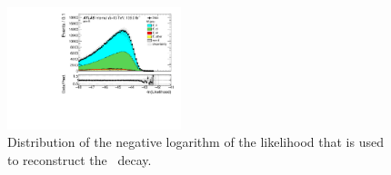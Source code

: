 \documentclass[letterpaper,12pt]{article}
\begin{document}
\begin{figure}%
	\centering
	\includegraphics[width=0.45\textwidth]{prefit/DataMC_h_LLR_all_3bunc.pdf}
	\caption{Distribution of  the negative logarithm of the likelihood that
	is used to reconstruct the \ttbar\ decay.}
	\label{fig:llr}
\end{figure}



\end{document}
